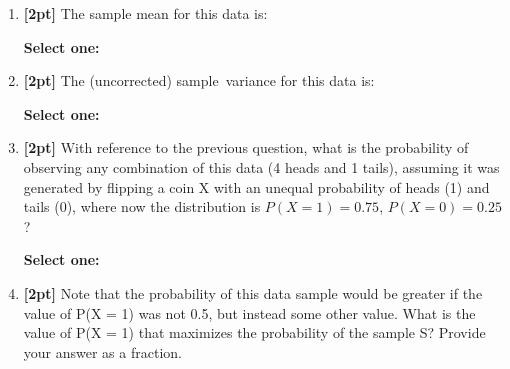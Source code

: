 \documentclass[12pt]{article}
\renewcommand{\circle}{\tikz\draw[black] (0,0) circle (1ex);}
\begin{document}
\begin{enumerate}
    \item \textbf{[2pt]} The sample mean for this data is:
    
    \textbf{Select one:}



    \item \textbf{[2pt]} The (uncorrected) sample variance for this data is:

    \textbf{Select one:}



    \item \textbf{[2pt]} With reference to the previous question, what is the probability of observing any combination of this data (4 heads and 1 tails), assuming it was generated by flipping a coin X with an unequal probability of heads (1) and tails (0), where now the distribution is $P(X = 1) = 0.75$, $P(X = 0) = 0.25$?

    \textbf{Select one:}



    \item \textbf{[2pt]} Note that the probability of this data sample would be greater if the value of P(X = 1) was not 0.5, but instead some other value. What is the value of P(X = 1) that maximizes the probability of the sample S? Provide your answer as a fraction.
    

\end{enumerate}
\end{document}
